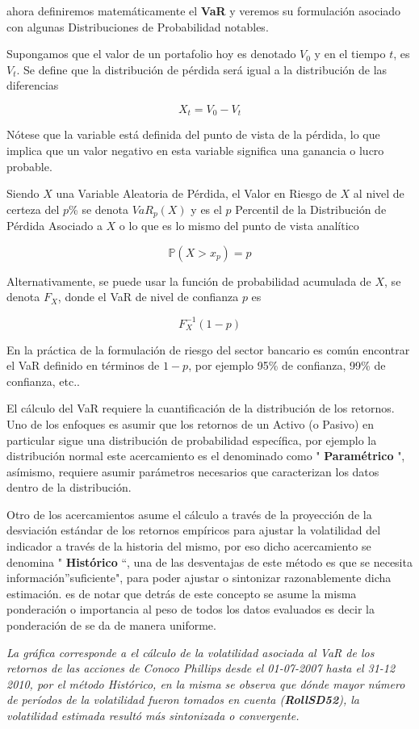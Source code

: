\documentclass[10pt,]{article}
\begin{document}
ahora definiremos matemáticamente el \textbf{VaR} y veremos su
formulación asociado con algunas Distribuciones de Probabilidad
notables.

Supongamos que el valor de un portafolio hoy es denotado \(V_0\) y en el
tiempo \(t\), es \(V_t\). Se define que la distribución de pérdida será
igual a la distribución de las diferencias

\[X_t = V_0 - V_t\]

Nótese que la variable está definida del punto de vista de la pérdida,
lo que implica que un valor negativo en esta variable significa una
ganancia o lucro probable.

Siendo \(X\) una Variable Aleatoria de Pérdida, el Valor en Riesgo de
\(X\) al nivel de certeza del \(p\)\% se denota \(VaR_{p}(X)\) y es el
\(p\) Percentil de la Distribución de Pérdida Asociado a \(X\) o lo que
es lo mismo del punto de vista analítico

\[\mathbb{P}(X>x_p)=p\]

Alternativamente, se puede usar la función de probabilidad acumulada de
\(X\), se denota \(F_X\), donde el VaR de nivel de confianza \(p\) es

\[F_{X}^{-1}(1-p)\]

En la práctica de la formulación de riesgo del sector bancario es común
encontrar el VaR definido en términos de \(1-p\), por ejemplo 95\% de
confianza, 99\% de confianza, etc..

El cálculo del VaR requiere la cuantificación de la distribución de los
retornos. Uno de los enfoques es asumir que los retornos de un Activo (o
Pasivo) en particular sigue una distribución de probabilidad específica,
por ejemplo la distribución normal este acercamiento es el denominado
como " \textbf{Paramétrico} ", asímismo, requiere asumir parámetros
necesarios que caracterizan los datos dentro de la distribución.

Otro de los acercamientos asume el cálculo a través de la proyección de
la desviación estándar de los retornos empíricos para ajustar la
volatilidad del indicador a través de la historia del mismo, por eso
dicho acercamiento se denomina " \textbf{Histórico} ``, una de las
desventajas de este método es que se necesita información''suficiente",
para poder ajustar o sintonizar razonablemente dicha estimación. es de
notar que detrás de este concepto se asume la misma ponderación o
importancia al peso de todos los datos evaluados es decir la ponderación
de se da de manera uniforme.

\emph{La gráfica corresponde a el cálculo de la volatilidad asociada al
VaR de los retornos de las acciones de Conoco Phillips desde el
01-07-2007 hasta el 31-12 2010, por el método Histórico, en la misma se
observa que dónde mayor número de períodos de la volatilidad fueron
tomados en cuenta (\textbf{RollSD52}), la volatilidad estimada resultó
más sintonizada o convergente.}
\end{document}
